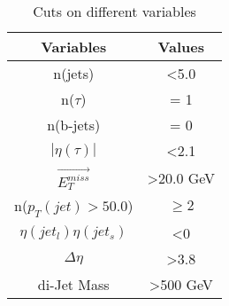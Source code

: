 
\begin{table}[h]
\centering
\caption{Cuts on different variables}
\label{Cuts_variables}
\begin{tabular}{|c|c|}
\hline
Variables                & Values                \\ \hline
n(jets)                  & \textless 5.0         \\ \hline
n($\tau$)                & = 1                   \\ \hline
n(b-jets)                & = 0                   \\ \hline
$|\eta(\tau)|$           & \textless 2.1         \\ \hline
$\vec{E_T^{miss}}$       & \textgreater 20.0 GeV \\ \hline
n($p_T(jet) > 50.0$)     & $\geq 2$              \\ \hline
$\eta(jet_l)\eta(jet_s)$ & \textless0            \\ \hline
$\Delta \eta$            & \textgreater3.8       \\ \hline
di-Jet Mass                & \textgreater500 GeV    \\ \hline
\end{tabular}
\end{table}


